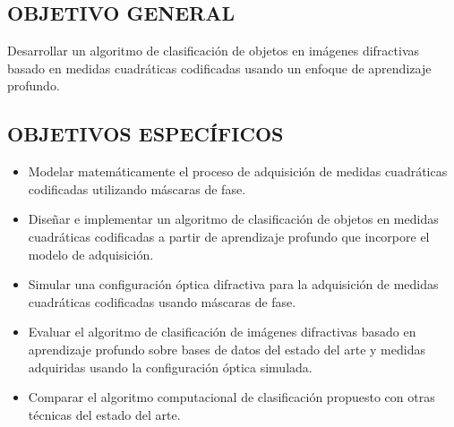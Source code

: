\subsection{OBJETIVO GENERAL}
Desarrollar un algoritmo de clasificación de objetos en imágenes difractivas basado en medidas cuadráticas codificadas usando un enfoque de aprendizaje profundo.

\subsection{OBJETIVOS ESPECÍFICOS}

\begin{itemize}
    \item Modelar matemáticamente el proceso de adquisición de medidas cuadráticas codificadas utilizando máscaras de fase.

    \item Diseñar e implementar un algoritmo de clasificación de objetos en medidas cuadráticas codificadas a partir de aprendizaje profundo que incorpore el modelo de adquisición.
    
    \item Simular una configuración óptica difractiva para la adquisición de medidas cuadráticas codificadas usando máscaras de fase.
    
    \item Evaluar el algoritmo de clasificación de imágenes difractivas basado en aprendizaje profundo sobre bases de datos del estado del arte y medidas adquiridas usando la configuración óptica simulada.
    
    \item Comparar el algoritmo computacional de clasificación propuesto con otras técnicas del estado del arte.
\end{itemize}


\pagebreak
